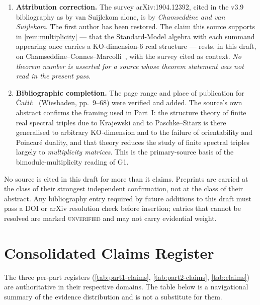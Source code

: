 \documentclass[12pt,a4paper,twoside]{article}
\theoremstyle{plain}
\theoremstyle{definition}
\theoremstyle{remark}
\begin{document}
\begin{enumerate}[leftmargin=1.6em,itemsep=0.25em]
\item \textbf{Attribution correction.} The survey arXiv:1904.12392,
cited in the v3.9 bibliography as by van Suijlekom alone, is by
\emph{Chamseddine and van Suijlekom}. The first author has been
restored. The claim this source supports in
\cref{rem:multiplicity} --- that the Standard-Model algebra with each
summand appearing once carries a KO-dimension-6 real structure ---
rests, in this draft, on Chamseddine--Connes--Marcolli~\cite{ccm2007},
with the survey cited as context. \emph{No theorem number is asserted
for a source whose theorem statement was not read in the present pass.}
\item \textbf{Bibliographic completion.} The page range and place of
publication for \'Ca\'ci\'c~\cite{cacic2011} (Wiesbaden, pp.~9--68) were
verified and added. The source's own abstract confirms the framing used
in Part~I: the structure theory of finite real spectral triples due to
Krajewski and to Paschke--Sitarz is there generalised to arbitrary
KO-dimension and to the failure of orientability and Poincar\'e duality,
and that theory reduces the study of finite spectral triples largely to
\emph{multiplicity matrices}. This is the primary-source basis of the
bimodule-multiplicity reading of G1.
\end{enumerate}

\noindent No source is cited in this draft for more than it claims.
Preprints are carried at the class of their strongest independent
confirmation, not at the class of their abstract. Any bibliography entry
required by future additions to this draft must pass a DOI or arXiv
resolution check before insertion; entries that cannot be resolved are
marked \textsc{unverified} and may not carry evidential weight.

\section{Consolidated Claims Register}
\label{sec:consolidated-claims}

\noindent The three per-part registers (\cref{tab:part1-claims},
\cref{tab:part2-claims}, \cref{tab:claims}) are authoritative in their
respective domains. The table below is a navigational summary of the
evidence distribution and is not a substitute for them.
\end{document}
